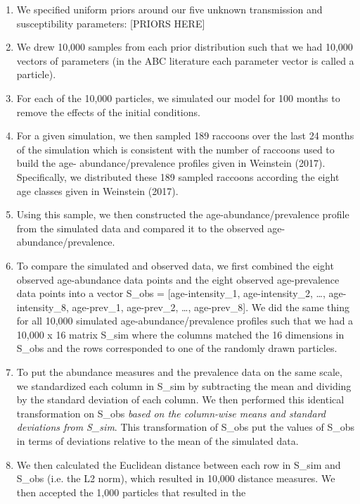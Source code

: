 \documentclass[11pt]{article}
\begin{document}
\begin{enumerate}
\def\labelenumi{\arabic{enumi}.}
\item
  We specified uniform priors around our five unknown transmission and
  susceptibility parameters: {[}PRIORS HERE{]}
\item
  We drew 10,000 samples from each prior distribution such that we had
  10,000 vectors of parameters (in the ABC literature each parameter
  vector is called a particle).
\item
  For each of the 10,000 particles, we simulated our model for 100
  months to remove the effects of the initial conditions.
\item
  For a given simulation, we then sampled 189 raccoons over the last 24
  months of the simulation which is consistent with the number of
  raccoons used to build the age- abundance/prevalence profiles given in
  Weinstein (2017). Specifically, we distributed these 189 sampled
  raccoons according the eight age classes given in Weinstein (2017).
\item
  Using this sample, we then constructed the age-abundance/prevalence
  profile from the simulated data and compared it to the observed age-
  abundance/prevalence.
\item
  To compare the simulated and observed data, we first combined the
  eight observed age-abundance data points and the eight observed
  age-prevalence data points into a vector S\_obs = {[}age-intensity\_1,
  age-intensity\_2, \ldots{}, age-intensity\_8, age-prev\_1,
  age-prev\_2, \ldots{}, age-prev\_8{]}. We did the same thing for all
  10,000 simulated age-abundance/prevalence profiles such that we had a
  10,000 x 16 matrix S\_sim where the columns matched the 16 dimensions
  in S\_obs and the rows corresponded to one of the randomly drawn
  particles.
\item
  To put the abundance measures and the prevalence data on the same
  scale, we standardized each column in S\_sim by subtracting the mean
  and dividing by the standard deviation of each column. We then
  performed this identical transformation on S\_obs \emph{based on the
  column-wise means and standard deviations from S\_sim}. This
  transformation of S\_obs put the values of S\_obs in terms of
  deviations relative to the mean of the simulated data.
\item
  We then calculated the Euclidean distance between each row in S\_sim
  and S\_obs (i.e. the L2 norm), which resulted in 10,000 distance
  measures. We then accepted the 1,000 particles that resulted in the

\end{enumerate}
\end{document}
